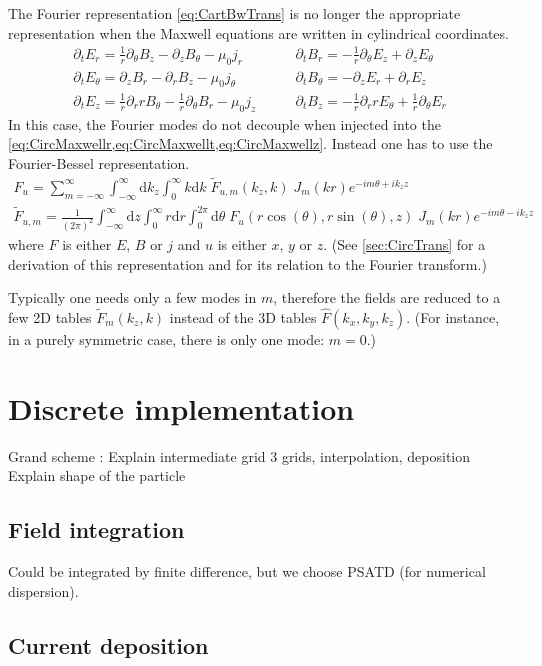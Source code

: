 \documentclass[a4paper]{article}   	%
\newcommand{\ir}{\frac{1}{r}}
\newcommand{\Integ}[1]{\int_{-\infty}^{\infty} \!\!\!\!\!
  \mathrm{d}#1}
\newcommand{\RInteg}[1]{\int_{0}^{\infty} \!\!\!\!\! #1\mathrm{d}#1}
\newcommand{\TInteg}[1]{\int_{0}^{2\pi} \!\!\!\!\! \mathrm{d}#1}
\begin{document}
The Fourier representation \cref{eq:CartBwTrans} is no longer the
appropriate representation when the Maxwell equations are written in cylindrical coordinates.
\begin{align}
\partial_t E_r = \ir \partial_\theta B_z - \partial_z B_\theta - \mu_0  j_r \qquad&   
\partial_t B_r = -\ir \partial_\theta E_z + \partial_z E_\theta \label{eq:CircMaxwellr} \\
\partial_t E_\theta = \partial_z B_r - \partial_r B_z - \mu_0  j_\theta \qquad &   
\partial_t B_\theta = -\partial_z E_r + \partial_r E_z \label{eq:CircMaxwellt}  \\
\partial_t E_z = \ir\partial_r r B_\theta - \ir\partial_\theta B_r - \mu_0  j_z \qquad &   
\partial_t B_z = -\ir\partial_r r E_\theta + \ir\partial_\theta E_r \label{eq:CircMaxwellz} 
\end{align}
In this case, the Fourier modes do not decouple when injected into the \cref{eq:CircMaxwellr,eq:CircMaxwellt,eq:CircMaxwellz}. Instead one has to use the Fourier-Bessel representation.
\begin{align}
F_u = \sum_{m=-\infty}^{\infty} \Integ{k_z}
\RInteg{k}\; \tilde{F}_{u,m}(k_z,k) \; J_m(kr) e^{-im\theta + ik_z z} 
\label{eq:CircBwTransu} \\
\tilde{F}_{u,m} = \frac{1}{(2\pi)^2} \Integ{z} \RInteg{r}
\TInteg{\theta} \;F_u(r\cos(\theta), r\sin(\theta),z)\; J_m(kr) e^{-im\theta
 - i k_z z}
\label{eq:CircFwTransu} 
\end{align}
where $F$ is either $E$, $B$ or $j$ and $u$ is either $x$, $y$ or $z$.
 (See \cref{sec:CircTrans} for a derivation of this representation and
 for its relation to the Fourier transform.)

Typically one needs only a few modes in $m$, therefore the fields are reduced to
a few 2D tables $\tilde{F}_m(k_z,k)$ instead of the 3D tables
$\hat{F}(k_x,k_y,k_z)$. (For instance, in a purely symmetric case, there is only one
mode: $m=0$.)




\section{Discrete implementation}

Grand scheme :
Explain intermediate grid
3 grids, interpolation, deposition 
Explain shape of the particle

\subsection{Field integration}

Could be integrated by finite difference, but we choose PSATD (for numerical dispersion).

\subsection{Current deposition}

\subsection{} 

\appendix


\end{document}

